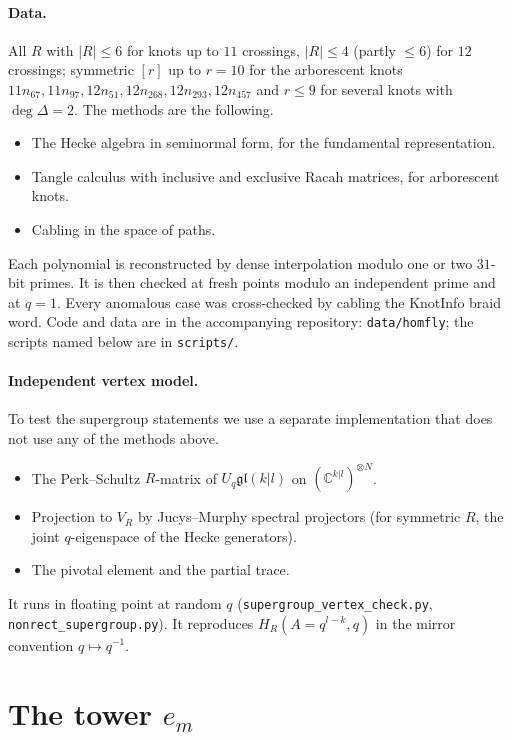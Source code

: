 \documentclass[11pt]{article}
\theoremstyle{definition}
\theoremstyle{remark}
\newcommand{\gl}{\mathfrak{gl}}
\begin{document}
\paragraph{Data.}  All $R$ with $|R|\le6$ for knots up to $11$ crossings, $|R|\le4$ (partly $\le6$) for $12$
crossings; symmetric $[r]$ up to $r=10$ for the arborescent knots $11n_{67},11n_{97},12n_{51},12n_{268},12n_{293},
12n_{457}$ and $r\le9$ for several knots with $\deg\Delta=2$.  The methods are the following.
\begin{itemize}
\item The Hecke algebra in seminormal form, for the fundamental representation.
\item Tangle calculus with inclusive and exclusive Racah matrices, for arborescent knots.
\item Cabling in the space of paths.
\end{itemize}
Each polynomial is reconstructed by dense interpolation modulo one or two $31$-bit primes.  It is then checked at
fresh points modulo an independent prime and at $q=1$.  Every anomalous case was cross-checked by cabling the
KnotInfo braid word.  Code and data are in the accompanying repository: \texttt{data/homfly}; the scripts named
below are in \texttt{scripts/}.

\paragraph{Independent vertex model.}  To test the supergroup statements we use a separate implementation that
does not use any of the methods above.
\begin{itemize}
\item The Perk--Schultz $R$-matrix of $U_q\gl(k|l)$ on $(\mathbb{C}^{k|l})^{\otimes N}$.
\item Projection to $V_R$ by Jucys--Murphy spectral projectors (for symmetric $R$, the joint $q$-eigenspace of
the Hecke generators).
\item The pivotal element and the partial trace.
\end{itemize}
It runs in floating point at random $q$ (\texttt{supergroup\_vertex\_check.py}, \texttt{nonrect\_supergroup.py}).
It reproduces $H_R(A=q^{l-k},q)$ in the mirror convention $q\mapsto q^{-1}$.

\section{The tower $e_m$}\label{sec:tower}
\end{document}
